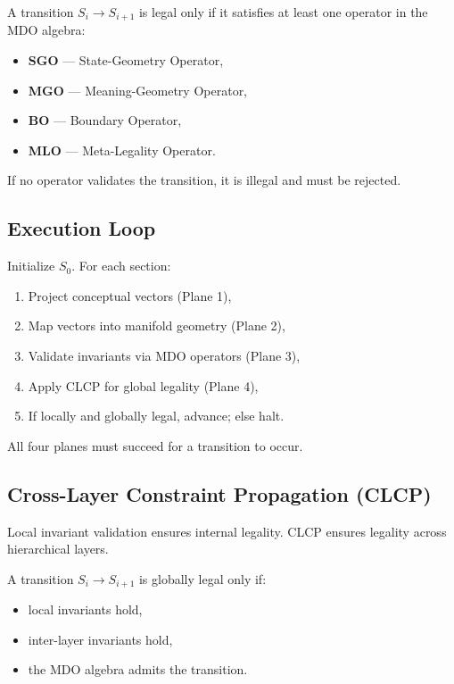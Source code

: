 A transition $S_i \rightarrow S_{i+1}$ is legal only if it satisfies at least one
operator in the MDO algebra:

\begin{itemize}[leftmargin=1.2cm]
    \item \textbf{SGO} — State-Geometry Operator,
    \item \textbf{MGO} — Meaning-Geometry Operator,
    \item \textbf{BO} — Boundary Operator,
    \item \textbf{MLO} — Meta-Legality Operator.
\end{itemize}

If no operator validates the transition, it is illegal and must be rejected.

\subsection*{Execution Loop}

Initialize $S_0$. For each section:
\begin{enumerate}[leftmargin=1.2cm]
    \item Project conceptual vectors (Plane 1),
    \item Map vectors into manifold geometry (Plane 2),
    \item Validate invariants via MDO operators (Plane 3),
    \item Apply CLCP for global legality (Plane 4),
    \item If locally and globally legal, advance; else halt.
\end{enumerate}

All four planes must succeed for a transition to occur.

\subsection*{Cross-Layer Constraint Propagation (CLCP)}

Local invariant validation ensures internal legality.  
CLCP ensures legality across hierarchical layers.

A transition $S_i \rightarrow S_{i+1}$ is globally legal only if:
\begin{itemize}[leftmargin=1.2cm]
    \item local invariants hold,
    \item inter-layer invariants hold,
    \item the MDO algebra admits the transition.
\end{itemize}


